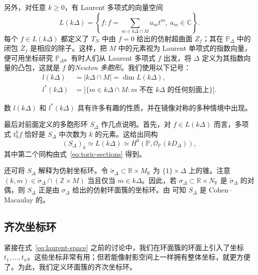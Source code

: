 另外，对任意 $k\geq0$，有 Laurent 多项式的向量空间
\begin{equation}\label{eq:laurent-space}
L(k\Delta)=\left\{f:f=\sum_{m\in k\Delta\cap M}a_mt^m,\ a_m\in\mathbb C\right\}.
\end{equation}
每个 $f\in L(k\Delta)$ 都定义了 $T_N$ 中由 $f=0$ 给出的仿射超曲面 $Z_f$；其在 $\mathbb P_\Delta$ 中的闭包 $\overline Z_f$ 是相应的除子。这样，把 $M$ 中的元素视为 Laurent 单项式的指数向量，便可用坐标研究 $\mathbb P_\Delta$。有时人们从 Laurent 多项式 $f$ 出发，将 $\Delta$ 定义为其指数向量的凸包，这就是 $f$ 的\emph{Newton 多胞形}。我们使用以下记号：
\begin{equation}\label{eq:lattice-points}
\begin{aligned}
l(k\Delta)&=|k\Delta\cap M|=\dim L(k\Delta),\\
l^*(k\Delta)&=|\{m\in k\Delta\cap M:m\text{ 不在 }k\Delta\text{ 的任何刻面上}\}|.
\end{aligned}
\end{equation}

数 $l(k\Delta)$ 和 $l^*(k\Delta)$ 具有许多有趣的性质，并在镜像对称的多种情境中出现。

最后对前面定义的多胞形环 $S_\Delta$ 作几点说明。首先，对 $f\in L(k\Delta)$ 而言，多项式 $t_0^kf$ 恰好是 $S_\Delta$ 中次数为 $k$ 的元素。这给出同构
\begin{equation}\label{eq:polytope-ring-sections}
(S_\Delta)_k\simeq L(k\Delta)\simeq
H^0(\mathbb P,\mathcal O_{\mathbb P}(kD_\Delta)),
\end{equation}
其中第二个同构由式~\eqref{eq:toric-sections} 得到。

还可将 $S_\Delta$ 解释为仿射坐标环。令 $\check\sigma_\Delta\subset\mathbb R\times M_{\mathbb R}$ 为 $\{1\}\times\Delta$ 上的锥。注意 $(k,m)\in\check\sigma_\Delta\cap(\mathbb Z\times M)$ 当且仅当 $m\in k\Delta$。因此，若 $\sigma_\Delta\subset\mathbb R\times N_{\mathbb R}$ 是 $\check\sigma_\Delta$ 的对偶，则 $S_\Delta$ 正是由 $\sigma_\Delta$ 给出的仿射环面簇的坐标环。由  可知 $S_\Delta$ 是 Cohen--Macaulay 的。

\subsection{齐次坐标环}\label{subsec:homogeneous-ring}

紧接在式~\eqref{eq:laurent-space} 之前的讨论中，我们在环面簇的环面上引入了坐标 $t_1,\ldots,t_n$。这些坐标非常有用；但若能像射影空间上一样拥有整体坐标，就更方便了。为此，我们定义环面簇的齐次坐标环。

